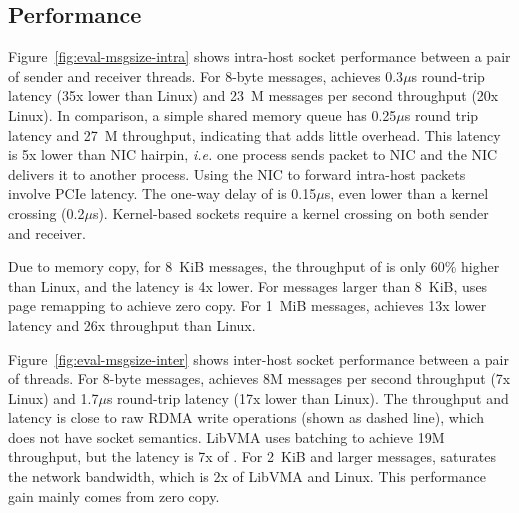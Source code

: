 \subsection{Performance}



Figure~\ref{fig:eval-msgsize-intra} shows intra-host socket performance between a pair of sender and receiver threads.
For 8-byte messages, \sys achieves 0.3$\mu$s round-trip latency (35x lower than Linux) and 23~M messages per second throughput (20x Linux).
In comparison, a simple shared memory queue has 0.25$\mu$s round trip latency and 27~M throughput, indicating that \sys adds little overhead.
This latency is 5x lower than NIC hairpin, \textit{i.e.} one process sends packet to NIC and the NIC delivers it to another process. Using the NIC to forward intra-host packets involve PCIe latency.
The one-way delay of \sys is 0.15$\mu$s, even lower than a kernel crossing (0.2$\mu$s). Kernel-based sockets require a kernel crossing on both sender and receiver.

Due to memory copy, for 8~KiB messages, the throughput of \sys is only 60\% higher than Linux, and the latency is 4x lower. For messages larger than 8~KiB, \sys uses page remapping to achieve zero copy. For 1~MiB messages, \sys achieves 13x lower latency and 26x throughput than Linux.


Figure~\ref{fig:eval-msgsize-inter} shows inter-host socket performance between a pair of threads.
For 8-byte messages, \sys achieves 8M messages per second throughput (7x Linux) and 1.7$\mu$s round-trip latency (17x lower than Linux).
The throughput and latency is close to raw RDMA write operations (shown as dashed line), which does not have socket semantics.
LibVMA uses batching to achieve 19M throughput, but the latency is 7x of \sys.
For 2~KiB and larger messages, \sys saturates the network bandwidth, which is 2x of LibVMA and Linux. This performance gain mainly comes from zero copy.




